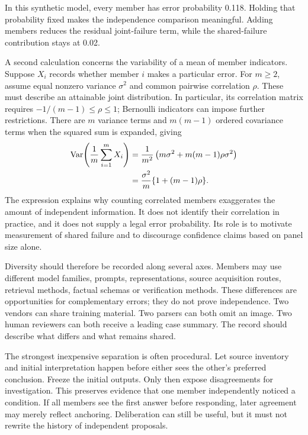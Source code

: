 \documentclass[12pt,a4paper,oneside,openany]{book}
\begin{document}
In this synthetic model, every member has error probability 0.118. Holding that probability fixed makes the independence comparison meaningful. Adding members reduces the residual joint-failure term, while the shared-failure contribution stays at 0.02.


A second calculation concerns the variability of a mean of member indicators.
Suppose $X_i$ records whether member $i$ makes a particular error. For
$m\geq2$, assume equal nonzero variance $\sigma^2$ and common pairwise
correlation $\rho$. These must describe an attainable joint distribution.
In particular, its correlation matrix requires
$-1/(m-1)\leq\rho\leq1$; Bernoulli indicators can impose further
restrictions. There are $m$ variance terms and $m(m-1)$ ordered covariance
terms when the squared sum is expanded, giving
\begin{align}
 \operatorname{Var}\!\left(\frac1m\sum_{i=1}^m X_i\right)
 &=\frac{1}{m^2}\left(m\sigma^2+m(m-1)\rho\sigma^2\right)\notag\\
 &=\frac{\sigma^2}{m}\{1+(m-1)\rho\}.
 \label{eq:ensemble-variance}
\end{align}
The expression explains why counting correlated members exaggerates the amount
of independent information. It does not identify their correlation in practice,
and it does not supply a legal error probability. Its role is to motivate
measurement of shared failure and to discourage confidence claims based on panel
size alone.

Diversity should therefore be recorded along several axes. Members may use
different model families, prompts, representations, source acquisition routes,
retrieval methods, factual schemas or verification methods. These differences are
opportunities for complementary errors; they do not prove independence. Two
vendors can share training material. Two parsers can both omit an image. Two human
reviewers can both receive a leading case summary. The record should describe
what differs and what remains shared.

The strongest inexpensive separation is often procedural. Let source inventory
and initial interpretation happen before either sees the other's preferred
conclusion. Freeze the initial outputs. Only then expose disagreements for
investigation. This preserves evidence that one member independently noticed a
condition. If all members see the first answer before responding, later agreement
may merely reflect anchoring. Deliberation can still be useful, but it must not
rewrite the history of independent proposals.
\end{document}
